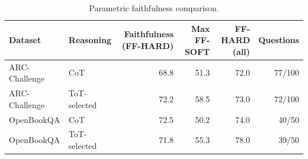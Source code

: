 \begin{table}[H]
\centering
\caption{Parametric faithfulness comparison.}
\label{tab:cot-tot-faithfulness}
\begin{tabular}{llrrrr}
\toprule
Dataset & Reasoning & Faithfulness (FF-HARD) & Max FF-SOFT & FF-HARD (all) & Questions \\
\midrule
ARC-Challenge & CoT & 68.8 & 51.3 & 72.0 & 77/100 \\
ARC-Challenge & ToT-selected & 72.2 & 58.5 & 73.0 & 72/100 \\
OpenBookQA & CoT & 72.5 & 50.2 & 74.0 & 40/50 \\
OpenBookQA & ToT-selected & 71.8 & 55.3 & 78.0 & 39/50 \\
\bottomrule
\end{tabular}
\end{table}
